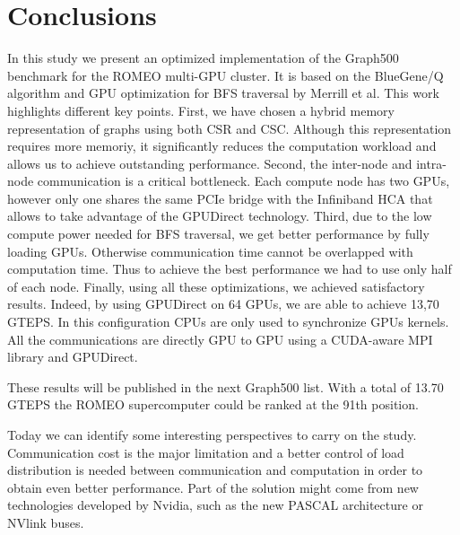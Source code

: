 \section{Conclusions}
In this study we present an optimized implementation of the Graph500 benchmark for the ROMEO  multi-GPU cluster. It is based on the BlueGene/Q algorithm and GPU optimization for BFS traversal by Merrill et al. 
This work highlights different key points.
First, we have chosen a hybrid memory representation of graphs using both CSR and CSC. %
Although this representation requires more memoriy, it significantly reduces  the computation workload and allows us to achieve outstanding performance.
Second, the inter-node and intra-node communication is a critical bottleneck. 
Each compute node has two GPUs, however only one shares the same PCIe bridge with the Infiniband HCA that allows to take advantage of the GPUDirect technology.
Third, due to the low compute power needed for BFS traversal, we get better performance by fully loading GPUs.
Otherwise communication time cannot be overlapped with computation time. 
Thus to achieve the best performance we had to use only half of each node.
Finally, using all these optimizations, we achieved satisfactory results. 
Indeed, by using GPUDirect on 64 GPUs,  we are able to achieve 13,70 GTEPS. 
In this configuration CPUs are only used to synchronize GPUs kernels. 
All the communications are directly GPU to GPU using a CUDA-aware MPI library and GPUDirect.

These results will be published in the next Graph500 list. With a total of 13.70 GTEPS the ROMEO supercomputer could be ranked at the 91th position. 

Today we can identify some interesting perspectives to carry on the study. 
Communication cost is the major limitation and a better control of load distribution is needed between communication and computation in order to obtain even better performance.
Part of the solution might come from new technologies developed by Nvidia, such as the new PASCAL architecture or NVlink buses.
 
